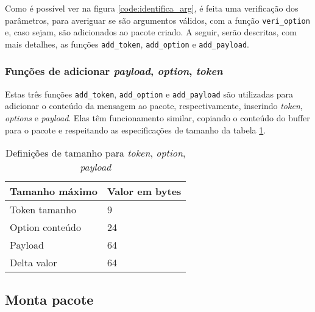 Como é possível ver na figura \ref{code:identifica_arg}, é feita uma verificação dos parâmetros, para averiguar se são argumentos válidos, com a função \texttt{veri\_option} e, caso sejam, são adicionados ao pacote criado. A seguir, serão descritas, com mais detalhes, as funções \texttt{add\_token}, \texttt{add\_option} e \texttt{add\_payload}. 

\subsubsection{Funções de adicionar \textit{payload}, \textit{option}, \textit{token}}

Estas três funções \texttt{add\_token}, \texttt{add\_option} e \texttt{add\_payload} são utilizadas para adicionar o conteúdo da mensagem ao pacote, respectivamente, inserindo \textit{token}, \textit{options} e \textit{payload}. Elas têm funcionamento similar, copiando o conteúdo do buffer para o pacote e respeitando as especificações de tamanho da tabela \ref{table:valores_token_option_payload}.

\begin{table}[!htb]
	\centering
	\caption{Definições de tamanho para \textit{token}, \textit{option}, \textit{payload}}
	\label{table:valores_token_option_payload}
	\begin{tabular}{l|l}
		Tamanho máximo  & Valor em bytes \\ \hline
		Token tamanho   & 9              \\ \hline
		Option conteúdo & 24             \\ \hline
		Payload         & 64             \\ \hline
		Delta valor     & 64            
	\end{tabular}
\end{table}

\subsection{Monta pacote}

